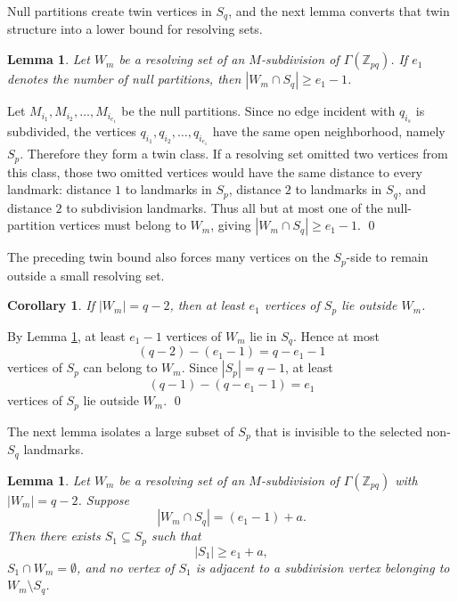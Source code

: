 \documentclass[12pt]{article}
\renewenvironment{proof}{{\bf \noindent Proof.}}{\qed}
\newtheorem{lemma}[theorem]{Lemma}
\newtheorem{corollary}[theorem]{Corollary}
\begin{document}
\medskip
\noindent Null partitions create twin vertices in $S_q$, and the next lemma converts that twin structure into a lower bound for resolving sets.
\begin{lemma}\label{lemma3.1}
Let $W_m$ be a resolving set of an $M$-subdivision of $\Gamma(\mathbb Z_{pq})$. If $e_1$ denotes the number of null partitions, then $|W_m\cap S_q|\geq e_1-1$.
\end{lemma}

\begin{proof}
Let $M_{i_1},M_{i_2},\ldots,M_{i_{e_1}}$ be the null partitions. Since no edge incident with $q_{i_s}$ is subdivided, the vertices $q_{i_1},q_{i_2},\ldots,q_{i_{e_1}}$ have the same open neighborhood, namely $S_p$. Therefore they form a twin class. If a resolving set omitted two vertices from this class, those two omitted vertices would have the same distance to every landmark: distance $1$ to landmarks in $S_p$, distance $2$ to landmarks in $S_q$, and distance $2$ to subdivision landmarks. Thus all but at most one of the null-partition vertices must belong to $W_m$, giving $|W_m\cap S_q|\geq e_1-1$.
\end{proof}

\medskip
\noindent The preceding twin bound also forces many vertices on the $S_p$-side to remain outside a small resolving set.
\begin{corollary}\label{cor-sp-outside}
If $|W_m|=q-2$, then at least $e_1$ vertices of $S_p$ lie outside $W_m$.
\end{corollary}

\begin{proof}
By Lemma \ref{lemma3.1}, at least $e_1-1$ vertices of $W_m$ lie in $S_q$. Hence at most
$$
(q-2)-(e_1-1)=q-e_1-1
$$
vertices of $S_p$ can belong to $W_m$. Since $|S_p|=q-1$, at least
$$
(q-1)-(q-e_1-1)=e_1
$$
vertices of $S_p$ lie outside $W_m$.
\end{proof}

\medskip
\noindent The next lemma isolates a large subset of $S_p$ that is invisible to the selected non-$S_q$ landmarks.
\begin{lemma}\label{lemma-3.2}
Let $W_m$ be a resolving set of an $M$-subdivision of $\Gamma(\mathbb Z_{pq})$ with $|W_m|=q-2$. Suppose
$$
|W_m\cap S_q|=(e_1-1)+a.
$$
Then there exists $S_1\subseteq S_p$ such that
$$
|S_1|\geq e_1+a,
$$
$S_1\cap W_m=\emptyset$, and no vertex of $S_1$ is adjacent to a subdivision vertex belonging to $W_m\setminus S_q$.
\end{lemma}
\end{document}
